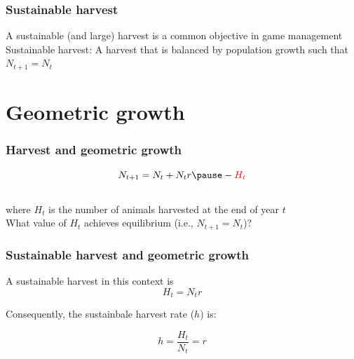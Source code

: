 \documentclass[color=usenames,dvipsnames]{beamer}\usepackage[]{graphicx}\usepackage[]{color}
\begin{document}










\begin{frame}
  \frametitle{Sustainable harvest}
  \large
  {%
    A sustainable (and large) harvest is a common
    objective in game management}
  \vfill
  \pause
  {%
    Sustainable harvest:}
    A harvest that is balanced by population growth such that $N_{t+1}
    = N_t$
\end{frame}





\section{Geometric growth}




\begin{frame}
  \frametitle{Harvest and geometric growth}
  \Large
  \[
   N_{t+1} = N_t + N_tr \pause - \color{red}{H_t}
  \] \\
  \pause
  \large
  where $H_t$ is the number of animals harvested at the end of year $t$ \\
  \pause
  \vfill %
  What value of $H_t$ achieves equilibrium (i.e., $N_{t+1} = N_t$)?  \\
\end{frame}




\begin{frame}
  \frametitle{Sustainable harvest and geometric growth}
  \large
  A sustainable harvest in this context is
  \LARGE
  \[
    H_t = N_tr
  \]
  \pause
  \large
  \vfill
  {%
    Consequently, the sustainbale harvest rate ($h$) is: \par}
  \LARGE
  \[
    h = \frac{H_t}{N_t} = r
  \]
\end{frame}
\end{document}
